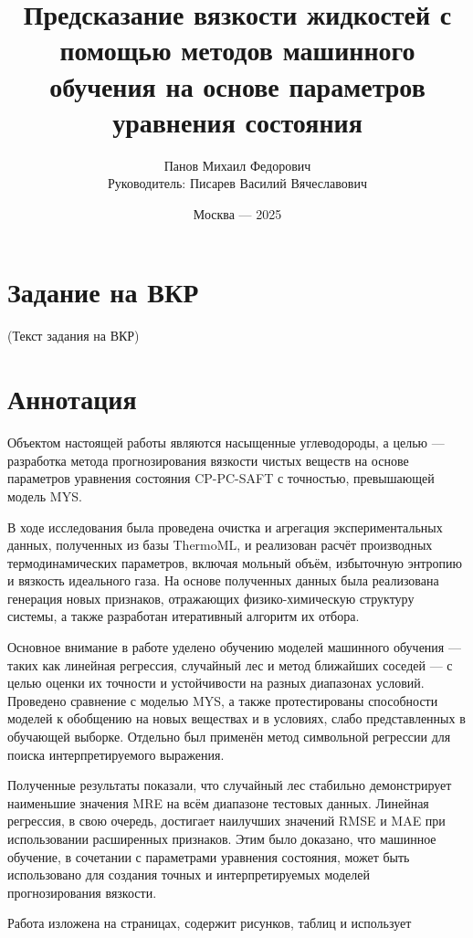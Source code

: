 \documentclass[a4paper,12pt]{article}
\title{\Huge{Предсказание вязкости жидкостей с помощью методов машинного обучения на основе параметров уравнения состояния}}
\author{Панов Михаил Федорович \\ Руководитель: Писарев Василий Вячеславович}
\date{Москва --- 2025}
\begin{document}
\maketitle
\thispagestyle{empty}
\newpage

\section*{Задание на ВКР}
(Текст задания на ВКР)

\section*{Аннотация}
  Объектом настоящей работы являются насыщенные углеводороды, а целью — разработка метода прогнозирования вязкости чистых веществ на основе параметров уравнения состояния CP-PC-SAFT с точностью, превышающей модель MYS.
  
  В ходе исследования была проведена очистка и агрегация экспериментальных данных, полученных из базы ThermoML, и реализован расчёт производных термодинамических параметров, включая мольный объём, избыточную энтропию и вязкость идеального газа. На основе полученных данных была реализована генерация новых признаков, отражающих физико-химическую структуру системы, а также разработан итеративный алгоритм их отбора.
  
  Основное внимание в работе уделено обучению моделей машинного обучения — таких как линейная регрессия, случайный лес и метод ближайших соседей — с целью оценки их точности и устойчивости на разных диапазонах условий. Проведено сравнение с моделью MYS, а также протестированы способности моделей к обобщению на новых веществах и в условиях, слабо представленных в обучающей выборке. Отдельно был применён метод символьной регрессии для поиска интерпретируемого выражения.
  
  Полученные результаты показали, что случайный лес стабильно демонстрирует наименьшие значения MRE на всём диапазоне тестовых данных. Линейная регрессия, в свою очередь, достигает наилучших значений RMSE и MAE при использовании расширенных признаков. Этим было доказано, что машинное обучение, в сочетании с параметрами уравнения состояния, может быть использовано для создания точных и интерпретируемых моделей прогнозирования вязкости.
  
  Работа изложена на \pageref{LastPage} страницах, содержит  рисунков,  таблиц и использует %
\end{document}
